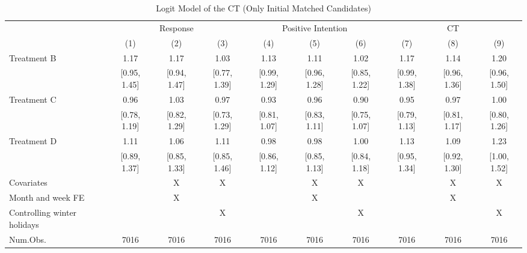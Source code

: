 \documentclass[12pt, a4paper]{article}
\begin{document}
\begin{landscape}\begin{table}[H]

\caption{\label{tab:logit-reply-test-initial-matched}Logit Model of the CT (Only Initial Matched Candidates)}
\centering
\fontsize{8}{10}\selectfont
\begin{threeparttable}
\begin{tabular}[t]{lccccccccc}
\toprule
\multicolumn{1}{c}{ } & \multicolumn{3}{c}{Response} & \multicolumn{3}{c}{Positive Intention} & \multicolumn{3}{c}{CT} \\
\cmidrule(l{3pt}r{3pt}){2-4} \cmidrule(l{3pt}r{3pt}){5-7} \cmidrule(l{3pt}r{3pt}){8-10}
  & (1) & (2) & (3) & (4) & (5) & (6) & (7) & (8) & (9)\\
\midrule
Treatment B & \num{1.17} & \num{1.17} & \num{1.03} & \num{1.13} & \num{1.11} & \num{1.02} & \num{1.17} & \num{1.14} & \num{1.20}\\
 & {}[\num{0.95}, \num{1.45}] & {}[\num{0.94}, \num{1.47}] & {}[\num{0.77}, \num{1.39}] & {}[\num{0.99}, \num{1.29}] & {}[\num{0.96}, \num{1.28}] & {}[\num{0.85}, \num{1.22}] & {}[\num{0.99}, \num{1.38}] & {}[\num{0.96}, \num{1.36}] & {}[\num{0.96}, \num{1.50}]\\
Treatment C & \num{0.96} & \num{1.03} & \num{0.97} & \num{0.93} & \num{0.96} & \num{0.90} & \num{0.95} & \num{0.97} & \num{1.00}\\
 & {}[\num{0.78}, \num{1.19}] & {}[\num{0.82}, \num{1.29}] & {}[\num{0.73}, \num{1.29}] & {}[\num{0.81}, \num{1.07}] & {}[\num{0.83}, \num{1.11}] & {}[\num{0.75}, \num{1.07}] & {}[\num{0.79}, \num{1.13}] & {}[\num{0.81}, \num{1.17}] & {}[\num{0.80}, \num{1.26}]\\
Treatment D & \num{1.11} & \num{1.06} & \num{1.11} & \num{0.98} & \num{0.98} & \num{1.00} & \num{1.13} & \num{1.09} & \num{1.23}\\
 & {}[\num{0.89}, \num{1.37}] & {}[\num{0.85}, \num{1.33}] & {}[\num{0.85}, \num{1.46}] & {}[\num{0.86}, \num{1.12}] & {}[\num{0.85}, \num{1.13}] & {}[\num{0.84}, \num{1.18}] & {}[\num{0.95}, \num{1.34}] & {}[\num{0.92}, \num{1.30}] & {}[\num{1.00}, \num{1.52}]\\
\midrule
Covariates &  & X & X &  & X & X &  & X & X\\
Month and week FE &  & X &  &  & X &  &  & X & \\
Controlling winter holidays &  &  & X &  &  & X &  &  & X\\
Num.Obs. & \num{7016} & \num{7016} & \num{7016} & \num{7016} & \num{7016} & \num{7016} & \num{7016} & \num{7016} & \num{7016}\\

\end{tabular}
\end{threeparttable}
\end{table}
\end{landscape}
\end{document}
